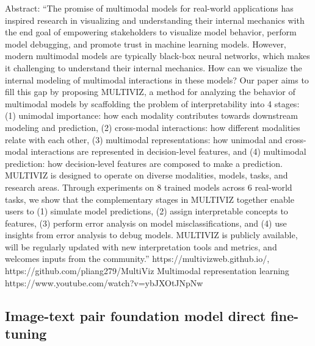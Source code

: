 \documentclass{article}%
\begin{document}
%
Abstract: “The promise of multimodal models for real{-}world applications has inspired research in visualizing and understanding their internal mechanics with the end goal of empowering stakeholders to visualize model behavior, perform model debugging, and promote trust in machine learning models. However, modern multimodal models are typically black{-}box neural networks, which makes it challenging to understand their internal mechanics. How can we visualize the internal modeling of multimodal interactions in these models? Our paper aims to fill this gap by proposing MULTIVIZ, a method for analyzing the behavior of multimodal models by scaffolding the problem of interpretability into 4 stages: (1) unimodal importance: how each modality contributes towards downstream modeling and prediction, (2) cross{-}modal interactions: how different modalities relate with each other, (3) multimodal representations: how unimodal and cross{-}modal interactions are represented in decision{-}level features, and (4) multimodal prediction: how decision{-}level features are composed to make a prediction. MULTIVIZ is designed to operate on diverse modalities, models, tasks, and research areas. Through experiments on 8 trained models across 6 real{-}world tasks, we show that the complementary stages in MULTIVIZ together enable users to (1) simulate model predictions, (2) assign interpretable concepts to features, (3) perform error analysis on model misclassifications, and (4) use insights from error analysis to debug models. MULTIVIZ is publicly available, will be regularly updated with new interpretation tools and metrics, and welcomes inputs from the community.”%
\newline%
\newline%
%
https://multivizweb.github.io/, https://github.com/pliang279/MultiViz  %
\newline%
\newline%
%
Multimodal representation learning https://www.youtube.com/watch?v=ybJXOtJNpNw %
\newline%
\newline%
%
\subsection{Image{-}text pair foundation model direct fine{-}tuning }%
\label{subsec:Image{-}textpairfoundationmodeldirectfine{-}tuning}%
\end{document}

